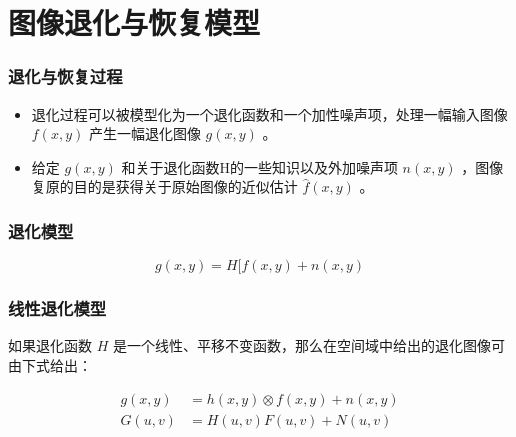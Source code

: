 \documentclass{beamer}
\begin{document}
\section{图像退化与恢复模型}
\label{sec-2}
\begin{frame}
\frametitle{退化与恢复过程}
\label{sec-2-1}


\begin{itemize}
\item 退化过程可以被模型化为一个退化函数和一个加性噪声项，处理一幅输入图像 $f(x,y)$ 产生一幅退化图像 $g(x,y)$ 。
\item 给定 $g(x,y)$ 和关于退化函数H的一些知识以及外加噪声项 $n(x,y)$ ，图像复原的目的是获得关于原始图像的近似估计 $\hat f(x,y)$ 。
\end{itemize}
\end{frame}
\begin{frame}
\frametitle{退化模型}
\label{sec-2-2}


\[ g(x,y) = H[f(x,y)+n(x,y) \]
\end{frame}
\begin{frame}
\frametitle{线性退化模型}
\label{sec-2-3}


如果退化函数 $H$ 是一个线性、平移不变函数，那么在空间域中给出的退化图像可由下式给出：

\begin{align*}
g(x,y) &= h(x,y)\otimes f(x,y)+n(x,y)\\
G(u,v) &= H(u,v)F(u,v)+N(u,v)
\end{align*}
\end{frame}
\end{document}
